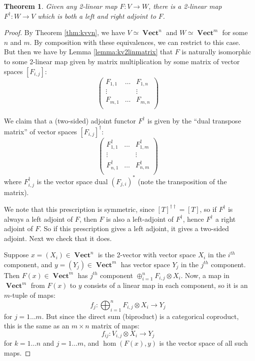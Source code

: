 \documentclass[10pt]{amsart}
\newtheorem{theorem}{Theorem}
\numberwithin{theorem}{subsection}
\newcommand{\ra}{\mathop{\rightarrow}}
\newcommand{\opname}[1]{\operatorname{#1}}
\newcommand{\catname}[1]{\boldsymbol{\opname{{#1}}}}
\newcommand{\V}{\catname{Vect}}
\begin{document}
\begin{theorem}\label{thm:biadjoint} Given any 2-linear map $F : V \ra
W$, there is a 2-linear map $F^{\dagger} : W \ra V$ which is both a left and
right adjoint to $F$.
\end{theorem}
\begin{proof}
By Theorem \ref{thm:kvvn}, we have $V \simeq \V^n$ and $W \simeq \V^m$
for some $n$ and $m$.  By composition with these equivalences, we can
restrict to this case.  But then we have by Lemma
\ref{lemma:kv2linmatrix} that $F$ is naturally isomorphic to some
2-linear map given by matrix multiplication by some matrix of vector
spaces $[F_{i,j}]$:
\begin{equation}
\begin{pmatrix}
F_{1,1} & \dots & F_{1,n} \\
\vdots & & \vdots \\
F_{m,1} & \dots & F_{m,n} \\
\end{pmatrix}
\end{equation}

We claim that a (two-sided) adjoint functor $F^{\dagger}$ is given by the ``dual
transpose matrix'' of vector spaces $[F_{i,j}]^{\dagger}$:
\begin{equation}
\begin{pmatrix}
F^{\dagger}_{1,1} & \dots & F^{\dagger}_{1,m}\\
\vdots & & \vdots \\
F^{\dagger}_{n,1} & \dots & F^{\dagger}_{n,m} \\
\end{pmatrix}
\end{equation}
where $F^{\dagger}_{i,j}$ is the vector space dual $(F_{j,i})^{\ast}$
(note the transposition of the matrix).

We note that this prescription is symmetric, since $[T]^{\dagger
\dagger} = [T]$, so if $F^{\dagger}$ is always a left adjoint of $F$, then $F$ is
also a left-adjoint of $F^{\dagger}$, hence $F^{\dagger}$ a right adjoint of $F$.  So if
this prescription gives a left adjoint, it gives a two-sided adjoint.
Next we check that it does.

Suppose $x=(X_i) \in \V^n$ is the 2-vector with vector space $X_i$ in
the $i^{th}$ component, and $y=(Y_j) \in \V^m$ has vector space $Y_j$
in the $j^{th}$ component.  Then $F(x) \in \V^m$ has $j^{th}$ component
$\oplus_{i=1}^n F_{i,j} \otimes X_i$.  Now, a map in $\V^m$ from $F(x)$
to $y$ consists of a linear map in each component, so it is an
$m$-tuple of maps:
\begin{equation}
f_j: \bigoplus_{i=1}^n F_{i,j} \otimes X_i \ra Y_j
\end{equation}
for $j = 1 \dots m$.  But since the direct sum (biproduct) is a
categorical coproduct, this is the same as an $m \times n$ matrix of
maps:
\begin{equation}
f_{ij}: V_{i,j} \otimes X_i \ra Y_j
\end{equation}
for $k = 1 \dots n$ and $j = 1 \dots m$, and $\hom(F(x),y)$ is the
vector space of all such maps.


\end{proof}
\end{document}
